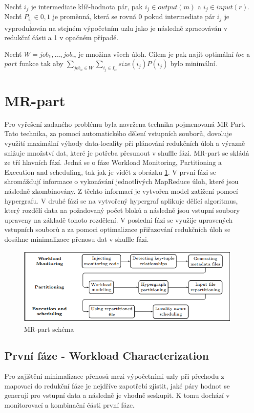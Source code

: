 \documentclass[thesis=M,czech]{FITthesis}[2012/06/26]
\begin{document}
Nechť $i_j$ je intermediate klíč-hodnota pár, pak  $i_j \in output(m)$ a $i_j \in input(r)$. Nechť $P_{i_j} \in {0,1}$ je proměnná, která se rovná 0 pokud intermediate pár $i_j$ je vyprodukován na stejném výpočetním uzlu jako je následně zpracováván v redukční části a 1 v opačném případě.  

Nechť $W = {job_1, ..., job_w}$ je množina všech úloh. Cílem je pak najít optimální $loc$ a $part$ funkce tak aby $\sum_{job_\alpha \in W} \sum_{i_j \in I_\alpha}  size(i_j)P(i_j) $ bylo minimální.

\section{MR-part}
Pro vyřešení zadaného problému byla navržena technika pojmenovaná MR-Part. Tato technika, za pomocí automatického dělení vstupních souborů, dovoluje využití maximální výhody data-locality při plánování redukčních úloh a výrazně snižuje množství dat, které je potřeba přesunout v shuffle fázi. MR-part se skládá ze tří hlavních fází. Jedná se o fáze Workload Monitoring, Partitioning a Execution and scheduling, tak jak je vidět z obrázku \ref{fig:MR-part}. V první fázi se shromážďují informace o vykonávání jednotlivých MapReduce úloh, které jsou následně zkombinovány. Z těchto informací je vytvořen model zatížení pomocí hypergrafu. V druhé fázi se na vytvořený hypergraf aplikuje dělící algoritmus, který rozdělí data na požadovaný počet bloků a následně jsou vstupní soubory upraveny na základě tohoto rozdělení. V poslední fázi se využije upravených vstupních souborů a za pomoci optimalizace přiřazování redukčních úloh se dosáhne minimalizace přenosu dat v shuffle fázi.

\begin{figure}\centering
	\includegraphics[width=1\textwidth, angle=0]{files/MR-part}
	\caption[MR-part schéma]{MR-part schéma}\label{fig:MR-part}
\end{figure}

\subsection{První fáze - Workload Characterization}
Pro zajištění minimalizace přenosů mezi výpočetními uzly při přechodu z mapovací do redukční fáze je nejdříve zapotřebí zjistit, jaké páry hodnot se generují pro vstupní data a následně je vhodně seskupit. K tomu dochází v monitorovací a kombinační části první fáze.
\end{document}
